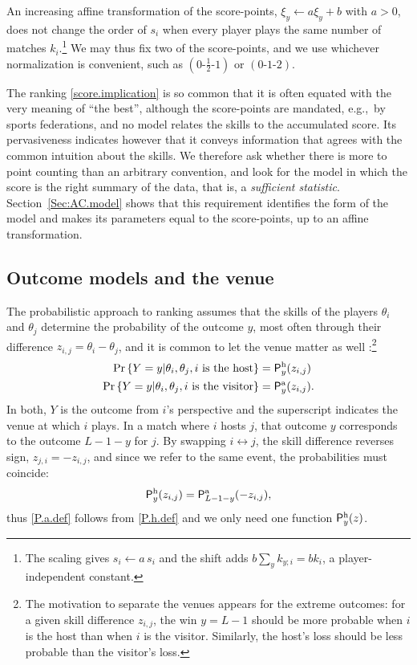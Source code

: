 \documentclass[letterpaper,12pt]{article}
\newcommand{\tnr}[1]{{\textnormal{#1}}}
\newcommand{\mf}[1]{\mathsf{#1}}
\newcommand{\eg}{e.g.,~}	%
\newcommand{\SET}[1]{\left\{#1\right\}}
\newcommand{\PR}[1]{\Pr\SET{#1}}       	%
\newcommand{\mfP}{\mf{P}}
\begin{document}
An increasing affine transformation of the score-points, $\xi_y\leftarrow a\xi_y +b$ with $a>0$, does not change the order of $s_i$ when every player plays the same number of matches $k_i$.\footnote{The scaling gives $s_i\leftarrow a\,s_i$ and the shift adds $b\sum_y k_{y;i}=b k_i$, a player-independent constant.} We may thus fix two of the score-points, and we use whichever normalization is convenient, such as $(0\text{-}\tfrac{1}{2}\text{-}1)$ or $(0\text{-}1\text{-}2)$.

The ranking \eqref{score.implication} is so common that it is often equated with the very meaning of ``the best'', although the score-points are mandated, \eg by sports federations, and no model relates the skills to the accumulated score. Its pervasiveness indicates however that it conveys information that agrees with the common intuition about the skills. We therefore ask whether there is more to point counting than an arbitrary convention, and look for the model in which the score is the right summary of the data, that is, a \emph{sufficient statistic}. Section~\ref{Sec:AC.model} shows that this requirement identifies the form of the model and makes its parameters equal to the score-points, up to an affine transformation.

\subsection{Outcome models and the venue}\label{Sec:ranking=inference}

The probabilistic approach to ranking assumes that the skills of the players $\theta_i$ and $\theta_j$ determine the probability of the outcome $y$, most often through their difference $z_{i,j}=\theta_i-\theta_j$, and it is common to let the venue matter as well \citep{Kuk95,fifa_rating_W}:\footnote{The motivation to separate the venues appears for the extreme outcomes: for a given skill difference $z_{i,j}$, the win $y=L-1$ should be more probable when $i$ is the host than when $i$ is the visitor. Similarly, the host's loss should be less probable than the visitor's loss.}
\begin{align}
\label{P.h.def}
    \PR{Y=y|\theta_i,\theta_j, i~ \text{is the host}}&=\mfP^\tnr{h}_y(z_{i,j})\\
\label{P.a.def}
    \PR{Y=y|\theta_i,\theta_j, i~ \text{is the visitor}}&=\mfP^\tnr{a}_y(z_{i,j}).
\end{align}
In both, $Y$ is the outcome from $i$'s perspective and the superscript indicates the venue at which $i$ plays. In a match where $i$ hosts $j$, that outcome $y$ corresponds to the outcome $L-1-y$ for $j$. By swapping $i\leftrightarrow j$, the skill difference reverses sign, $z_{j,i} = -z_{i,j}$, and since we refer to the same event, the probabilities must coincide:
\begin{align}
\label{P.h.P.a.reciprocity}
    \mfP^\tnr{h}_y(z_{i,j})=\mfP^\tnr{a}_{L-1-y}(-z_{i,j}),%
\end{align}
thus \eqref{P.a.def} follows from \eqref{P.h.def} and we only need one function $\mfP^\tnr{h}_y(z)$.
\end{document}
